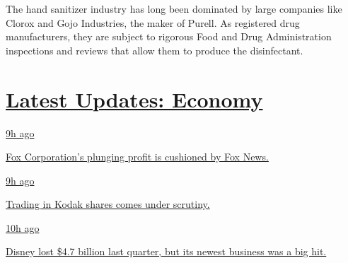 The hand sanitizer industry has long been dominated by large companies
like Clorox and Gojo Industries, the maker of Purell. As registered drug
manufacturers, they are subject to rigorous Food and Drug Administration
inspections and reviews that allow them to produce the disinfectant.

\hypertarget{latest-updates-economy}{%
\section{\texorpdfstring{\href{https://www.nytimes.com/live/2020/08/04/business/stock-market-today-coronavirus?action=click\&pgtype=Article\&state=default\&region=MAIN_CONTENT_1\&context=storylines_live_updates}{Latest
Updates:
Economy}}{Latest Updates: Economy}}\label{latest-updates-economy}}

\href{https://www.nytimes.com/live/2020/08/04/business/stock-market-today-coronavirus?action=click\&pgtype=Article\&state=default\&region=MAIN_CONTENT_1\&context=storylines_live_updates\#fox-corporations-plunging-profit-is-cushioned-by-fox-news}{9h
ago}

\href{https://www.nytimes.com/live/2020/08/04/business/stock-market-today-coronavirus?action=click\&pgtype=Article\&state=default\&region=MAIN_CONTENT_1\&context=storylines_live_updates\#fox-corporations-plunging-profit-is-cushioned-by-fox-news}{Fox
Corporation's plunging profit is cushioned by Fox News.}

\href{https://www.nytimes.com/live/2020/08/04/business/stock-market-today-coronavirus?action=click\&pgtype=Article\&state=default\&region=MAIN_CONTENT_1\&context=storylines_live_updates\#trading-in-kodak-shares-comes-under-scrutiny}{9h
ago}

\href{https://www.nytimes.com/live/2020/08/04/business/stock-market-today-coronavirus?action=click\&pgtype=Article\&state=default\&region=MAIN_CONTENT_1\&context=storylines_live_updates\#trading-in-kodak-shares-comes-under-scrutiny}{Trading
in Kodak shares comes under scrutiny.}

\href{https://www.nytimes.com/live/2020/08/04/business/stock-market-today-coronavirus?action=click\&pgtype=Article\&state=default\&region=MAIN_CONTENT_1\&context=storylines_live_updates\#disney-lost-4-7-billion-last-quarter-but-its-newest-business-was-a-big-hit}{10h
ago}

\href{https://www.nytimes.com/live/2020/08/04/business/stock-market-today-coronavirus?action=click\&pgtype=Article\&state=default\&region=MAIN_CONTENT_1\&context=storylines_live_updates\#disney-lost-4-7-billion-last-quarter-but-its-newest-business-was-a-big-hit}{Disney
lost \$4.7 billion last quarter, but its newest business was a big hit.}

